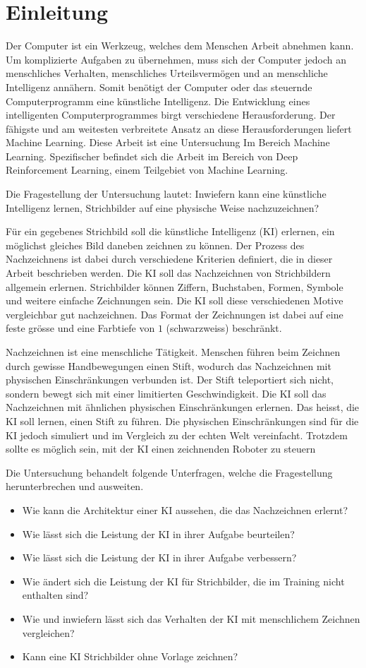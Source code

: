 
\chapter{Einleitung}\label{chap:einleit} Der Computer ist ein Werkzeug, welches
dem Menschen Arbeit abnehmen kann. Um komplizierte Aufgaben zu übernehmen, muss
sich der Computer jedoch an menschliches Verhalten, menschliches Urteilsvermögen
und an menschliche Intelligenz annähern. Somit benötigt der Computer oder das
steuernde Computerprogramm eine künstliche Intelligenz. Die Entwicklung eines
intelligenten Computerprogrammes birgt verschiedene Herausforderung. Der
fähigste und am weitesten verbreitete Ansatz an diese Herausforderungen liefert
Machine Learning. Diese Arbeit ist eine Untersuchung Im Bereich Machine
Learning. Spezifischer befindet sich die Arbeit im Bereich von Deep
Reinforcement Learning, einem Teilgebiet von Machine Learning.
 
Die Fragestellung der Untersuchung lautet: Inwiefern kann eine künstliche
Intelligenz lernen, Strichbilder auf eine physische Weise nachzuzeichnen?

Für ein gegebenes Strichbild soll die künstliche Intelligenz (KI) erlernen, ein
möglichst gleiches Bild daneben zeichnen zu können. Der Prozess des
Nachzeichnens ist dabei durch verschiedene Kriterien definiert, die in dieser
Arbeit beschrieben werden. Die KI soll das Nachzeichnen von Strichbildern
allgemein erlernen. Strichbilder können Ziffern, Buchstaben, Formen, Symbole und
weitere einfache Zeichnungen sein. Die KI soll diese verschiedenen Motive
vergleichbar gut nachzeichnen. Das Format der Zeichnungen ist dabei auf eine
feste grösse und eine Farbtiefe von $1$ (schwarzweiss) beschränkt.
 
Nachzeichnen ist eine menschliche Tätigkeit. Menschen führen beim Zeichnen durch
gewisse Handbewegungen einen Stift, wodurch das Nachzeichnen mit physischen
Einschränkungen verbunden ist. Der Stift teleportiert sich nicht, sondern bewegt
sich mit einer limitierten Geschwindigkeit. Die KI soll das Nachzeichnen mit
ähnlichen physischen Einschränkungen erlernen. Das heisst, die KI soll lernen,
einen Stift zu führen. Die physischen Einschränkungen sind für die KI jedoch
simuliert und im Vergleich zu der echten Welt vereinfacht. Trotzdem sollte es
möglich sein, mit der KI einen zeichnenden Roboter zu steuern
 
Die Untersuchung behandelt folgende Unterfragen, welche die Fragestellung
herunterbrechen und ausweiten.
\begin{itemize}
   \item Wie kann die Architektur einer KI aussehen, die das Nachzeichnen erlernt?
   \item Wie lässt sich die Leistung der KI in ihrer Aufgabe beurteilen?
   \item Wie lässt sich die Leistung der KI in ihrer Aufgabe verbessern?
   \item Wie ändert sich die Leistung der KI für Strichbilder, die im Training nicht enthalten sind?
   \item Wie und inwiefern lässt sich das Verhalten der KI mit menschlichem Zeichnen vergleichen?
   \item Kann eine KI Strichbilder ohne Vorlage zeichnen?
\end{itemize}
